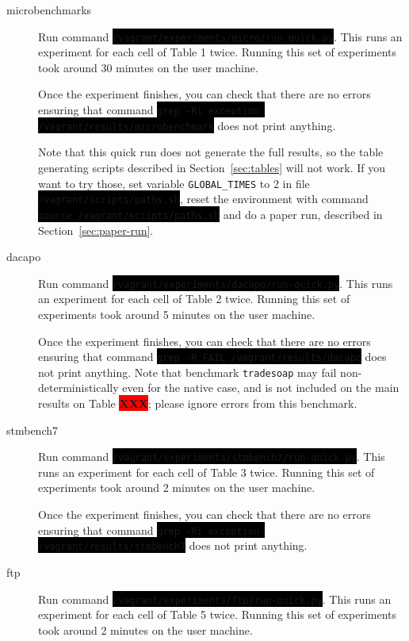 \documentclass[12pt]{article}
\newcommand{\command}[1]{\colorbox{black}{\texttt{\color{white}#1}}}
\newcommand{\XXX}{\colorbox{red}{\bf\color{white}XXX}}
\begin{document}
\begin{description}

    \item[microbenchmarks] Run command
        \command{/vagrant/experiments/micro/run-quick.py}.  This runs an
        experiment for each cell of Table 1 twice.  Running this set of
        experiments took around 30 minutes on the user machine.

        Once the experiment finishes, you can check that there are no errors
        ensuring that command \command{grep -Ri exception /vagrant/results/microbenchmark}
        does not print anything.

        Note that this quick run does not generate the full results, so the
        table generating scripts described in Section~\ref{sec:tables} will not
        work.  If you want to try those, set variable \texttt{GLOBAL\_TIMES} to
        2 in file \command{/vagrant/scripts/paths.sh}, reset the environment with
        command \command{source /vagrant/scripts/paths.sh} and do a paper run,
        described in Section~\ref{sec:paper-run}.

    \item[dacapo] Run command \command{/vagrant/experiments/dacapo/run-quick.py}.
        This runs an experiment for each cell of Table 2 twice.  Running this
        set of experiments took around 5 minutes on the user machine.

        Once the experiment finishes, you can check that there are no errors
        ensuring that command \command{grep -R FAIL /vagrant/results/dacapo} does not
        print anything.  Note that benchmark \texttt{tradesoap} may fail
        non-deterministically even for the native case, and is not included on
        the main results on Table \XXX; please ignore errors from this benchmark.

    \item[stmbench7] Run command
        \command{/vagrant/experiments/stmbench7/run-quick.py}.  This runs an
        experiment for each cell of Table 3 twice.  Running this set of
        experiments took around 2 minutes on the user machine.

        Once the experiment finishes, you can check that there are no errors
        ensuring that command \command{grep -Ri exception /vagrant/results/stmbench7}
        does not print anything.

    \item[ftp] Run command
        \command{/vagrant/experiments/ftp/run-quick.py}.  This runs an
        experiment for each cell of Table 5 twice.  Running this set of
        experiments took around 2 minutes on the user machine.


\end{description}
\end{document}
